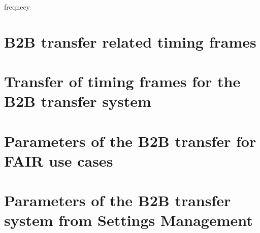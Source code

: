 \documentclass[12pt,twoside]{report}
\begin{document}
%
freqnecy \appendix
\chapter{B2B transfer related timing frames}

\chapter{Transfer of timing frames for the B2B transfer system}

\chapter{Parameters of the B2B transfer for FAIR use cases}

\chapter{Parameters of the B2B transfer system from Settings Management}






\renewcommand\chaptername{Publications}
\pagestyle{empty}


\renewcommand\chaptername{}
\pagestyle{empty}

%
\end{document}
